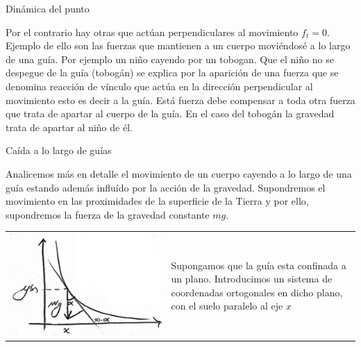 \documentclass[handout,hyperref={colorlinks=true}]{beamer}
\newcommand{\nl}{\onslide<+-> }
\begin{document}
\begin{frame}{Dinámica del punto}
 

\nl  Por el contrario hay otras que actúan perpendiculares al movimiento $f_t=0$. Ejemplo de ello son las fuerzas que mantienen a un cuerpo moviéndosé a lo largo 
de una guía. Por ejemplo un niño cayendo por un tobogan. Que el niño no se despegue de la guía (tobogán) se explica por la aparición de una fuerza que se denomina
reacción de vínculo que actúa en la dirección perpendicular al movimiento esto es decir a la guía. Está fuerza debe compensar a toda otra fuerza que trata de apartar
al cuerpo de la guía.  En el caso del tobogán la gravedad trata de apartar al niño de él.


\end{frame}

\begin{frame}{Caída a lo largo de guías}

Analicemos más en detalle el movimiento de un cuerpo cayendo a lo largo de una guía estando además influído  por la acción de la gravedad. Supondremos el movimiento
en las proximidades de la superficie de la Tierra y por ello, supondremos la fuerza de la gravedad constante $mg$. 
\begin{tabular}{m{5cm} m{4.5cm}}
 \includegraphics[scale=.07]{imagenes/caida_guia.jpg} & Supongamos que la guía esta
confinada a un plano. Introducimos un sistema de coordenadas ortogonales en dicho plano, con el suelo paralelo al eje $x$
\end{tabular}



\end{frame}
\end{document}
